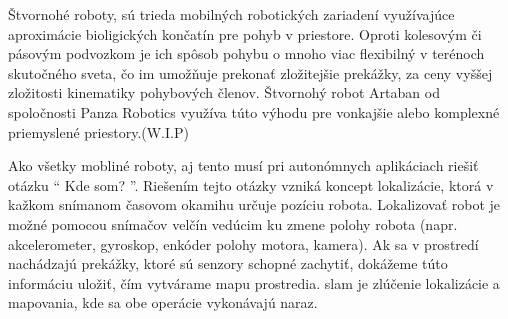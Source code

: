 Štvornohé roboty, sú trieda mobilných robotických zariadení využívajúce aproximácie bioligických končatín pre pohyb v priestore.\newline
Oproti kolesovým či pásovým podvozkom je ich spôsob pohybu o mnoho viac flexibilný v terénoch skutočného sveta, čo im umožňuje prekonať zložitejšie prekážky, za ceny vyššej zložitosti kinematiky pohybových členov.\newline
Štvornohý robot Artaban od spoločnosti Panza Robotics využíva túto výhodu pre vonkajšie alebo komplexné priemyslené priestory.(W.I.P)

Ako všetky mobliné roboty, aj tento musí pri autonómnych aplikáciach riešiť otázku `` Kde som? ''.\newline
Riešením tejto otázky vzniká koncept lokalizácie, ktorá v kažkom snímanom časovom okamihu určuje pozíciu robota. Lokalizovať robot je možné pomocou snímačov velčín vedúcim ku zmene polohy robota (napr. akcelerometer, gyroskop, enkóder polohy motora, kamera).\newline
Ak sa v prostredí nachádzajú prekážky, ktoré sú senzory schopné zachytiť, dokážeme túto informáciu uložiť, čím vytvárame mapu prostredia.\newline
\acrshort{slam} je zlúčenie lokalizácie a mapovania, kde sa obe operácie vykonávajú naraz.